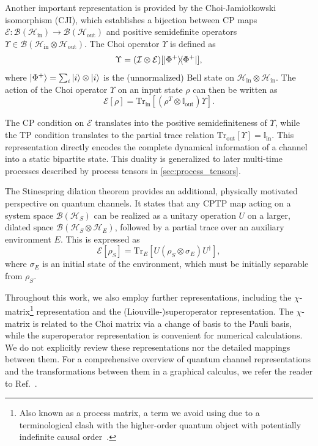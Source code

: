 \documentclass[
    aps,
    prx,
    reprint,
    superscriptaddress,
    longbibliography,
    nofootinbib,
    floatfix,
]{revtex4-2}
\newcommand{\Tr}{\mathrm{Tr}}
\newcommand{\ketbra}[2]{\ket{#1}\!\!\bra{#2}}  %
\begin{document}
Another important representation is provided by the Choi-Jamiołkowski isomorphism (CJI), which establishes a bijection between CP maps \(\mathcal{E}: \mathcal{B}(\mathcal{H}_{\mathrm{in}}) \to \mathcal{B}(\mathcal{H}_{\mathrm{out}})\) and positive semidefinite operators \(\Upsilon \in \mathcal{B}(\mathcal{H}_{\mathrm{in}} \otimes \mathcal{H}_{\mathrm{out}})\). The Choi operator \(\Upsilon\) is defined as
\begin{equation}
    \Upsilon = (\mathcal{I} \otimes \mathcal{E})[\ketbra{\Phi^+}{\Phi^+}],
\end{equation}
where \(\ket{\Phi^+} = \sum_i \ket{i}\otimes \ket{i}\) is the (unnormalized) Bell state on \(\mathcal{H}_{\mathrm{in}} \otimes \mathcal{H}_{\mathrm{in}}\). The action of the Choi operator \(\Upsilon\) on an input state \(\rho\) can then be written as
\begin{equation}\label{eq:choi-rep}
    \mathcal{E}[\rho] = \Tr_{\mathrm{in}}[(\rho^T \otimes \mathbb{I}_{\mathrm{out}})\Upsilon].
\end{equation}

The CP condition on \(\mathcal{E}\) translates into the positive semidefiniteness of \(\Upsilon\), while the TP condition translates to the partial trace relation \(\Tr_{\mathrm{out}}[\Upsilon] = \mathbb{I}_{\mathrm{in}}\). This representation directly encodes the complete dynamical information of a channel into a static bipartite state. This duality is generalized to later multi-time processes described by process tensors in \cref{sec:process_tensors}.

The Stinespring dilation theorem provides an additional, physically motivated perspective on quantum channels. It states that any CPTP map acting on a system space \(\mathcal{B}(\mathcal{H}_S)\) can be realized as a unitary operation \(U\) on a larger, dilated space \(\mathcal{B}(\mathcal{H}_S \otimes \mathcal{H}_E)\), followed by a partial trace over an auxiliary environment \(E\). This is expressed as
\begin{equation}
    \mathcal{E}[\rho_S] = \Tr_E[U(\rho_S \otimes \sigma_E)U^\dagger],
\end{equation}
where \(\sigma_E\) is an initial state of the environment, which must be initially separable from \(\rho_S\).

Throughout this work, we also employ further representations, including the \(\chi\)-matrix\footnote{Also known as a process matrix, a term we avoid using due to a terminological clash with the higher-order quantum object with potentially indefinite causal order~\cite{oreshkovQuantumCorrelationsNo2012}.} representation and the (Liouville-)superoperator representation. The \(\chi\)-matrix is related to the Choi matrix via a change of basis to the Pauli basis, while the superoperator representation is convenient for numerical calculations. We do not explicitly review these representations nor the detailed mappings between them. For a comprehensive overview of quantum channel representations and the transformations between them in a graphical calculus, we refer the reader to Ref.~\cite{woodTensorNetworksGraphical2015}.
\end{document}
